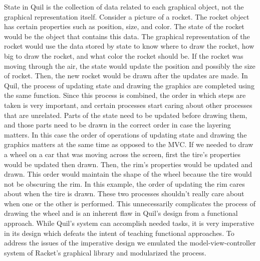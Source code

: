 \documentclass[12pt]{article}
\begin{document}
State in Quil is the collection of data related to each graphical object, not the graphical representation itself. Consider a picture of a rocket. The rocket object has certain properties such as position, size, and color. The state of the rocket would be the object that contains this data. The graphical representation of the rocket would use the data stored by state to know where to draw the rocket, how big to draw the rocket, and what color the rocket should be. If the rocket was moving through the air, the state would update the position and possibly the size of rocket. Then, the new rocket would be drawn after the updates are made. In Quil, the process of updating state and drawing the graphics are completed using the same function. Since this process is combined, the order in which steps are taken is very important, and certain processes start caring about other processes that are unrelated. Parts of the state need to be updated before drawing them, and those parts need to be drawn in the correct order in case the layering matters. In this case the order of operations of updating state and drawing the graphics matters at the same time as opposed to the MVC. If we needed to draw a wheel on a car that was moving across the screen, first the tire's properties would be updated then drawn. Then, the rim's properties would be updated and drawn. This order would maintain the shape of the wheel because the tire would not be obscuring the rim. In this example, the order of updating the rim cares about when the tire is drawn. These two processes shouldn't really care about when one or the other is performed. This unnecessarily complicates the process of drawing the wheel and is an inherent flaw in Quil's design from a functional approach. While Quil's system can accomplish needed tasks, it is very imperative in its design which defeats the intent of teaching functional approaches. To address the issues of the imperative design we emulated the model-view-controller system of Racket's graphical library and modularized the process.
\end{document}
